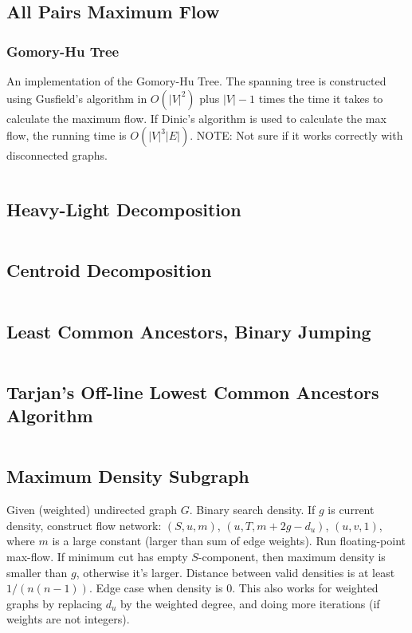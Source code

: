 \documentclass[8pt,a4paper,landscape,oneside]{amsart}
\newcommand{\code}[1]{\inputminted[fontsize=\normalsize,baselinestretch=1]{cpp}{_code/#1}}
\begin{document}
\begin{multicols*}{3}
    \subsection{All Pairs Maximum Flow}
        \subsubsection{Gomory-Hu Tree}
        An implementation of the Gomory-Hu Tree. The spanning tree is constructed using Gusfield's algorithm
        in $O(|V| ^ 2)$ plus $|V|-1$ times the time it takes to calculate the maximum flow.
        If Dinic's algorithm is used to calculate the max flow, the running time is $O(|V|^3|E|)$.
        NOTE: Not sure if it works correctly with disconnected graphs.
        \code{graph/gomory_hu_tree.cpp}

    \subsection{Heavy-Light Decomposition}
        \code{graph/hld.cpp}

    \subsection{Centroid Decomposition}
        \code{graph/centroid_decomposition.cpp}

    \subsection{Least Common Ancestors, Binary Jumping}
        \code{graph/lca.cpp}

    \subsection{Tarjan's Off-line Lowest Common Ancestors Algorithm}
        \code{graph/tarjan_olca.cpp}

    \subsection{Maximum Density Subgraph}
        Given (weighted) undirected graph $G$. Binary search density. If $g$ is
        current density, construct flow network: $(S, u, m)$, $(u, T,
        m+2g-d_u)$, $(u,v,1)$, where $m$ is a large constant (larger than sum
        of edge weights). Run floating-point max-flow. If minimum cut has empty
        $S$-component, then maximum density is smaller than $g$, otherwise it's
        larger. Distance between valid densities is at least $1/(n(n-1))$. Edge
        case when density is $0$. This also works for weighted graphs by
        replacing $d_u$ by the weighted degree, and doing more iterations (if
        weights are not integers).


\end{multicols*}
\end{document}
